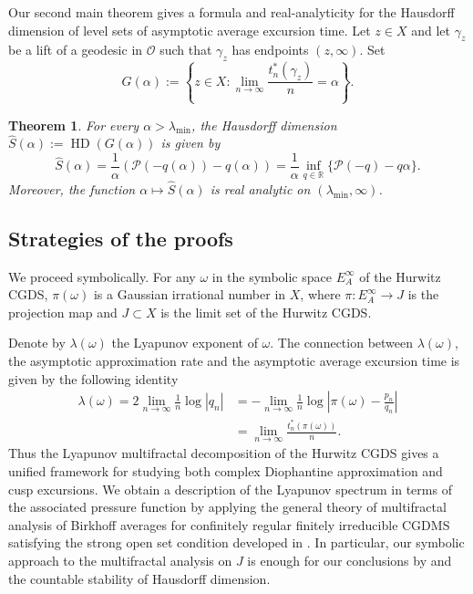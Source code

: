\documentclass[11pt]{amsart}
\theoremstyle{plain}
\newtheorem{theorem}{Theorem}[section]
\theoremstyle{definition}
\renewcommand\~{\tilde}%
\newcommand{\om}{\ensuremath{\omega}}
\numberwithin{equation}{section}
\begin{document}
Our second main theorem gives a formula and real-analyticity for the Hausdorff dimension of level sets of asymptotic average excursion time.
Let $z \in X$ and let $\gamma_z$ be a lift of a geodesic in $\mathcal{O}$ such that $\gamma_z$ has endpoints $(z,\infty)$.
Set 
$$G(\alpha)
    :=
    \left\{
    z \in X :
    \lim_{n\to\infty}
    \frac{t_n^*(\gamma_z)}{n}
    =
    \alpha
    \right\}.$$

\begin{theorem}\label{thm:main-2}
For every $\alpha>\lambda_{\min}$, the Hausdorff dimension $\hat S(\alpha):=\operatorname{HD}(G(\alpha))$
is given by
$$
    \hat S(\alpha)
    =
    \frac{1}{\alpha}
    \left(\mathcal P(-q(\alpha))-q(\alpha)\right)
    =
    \frac{1}{\alpha}
    \inf_{q\in\mathbb R}
    \{\mathcal P(-q)-q\alpha\}.
$$
Moreover, the function $\alpha \mapsto \hat S(\alpha)$ is real analytic on $(\lambda_{\min},\infty)$.
\end{theorem}


\subsection{Strategies of the proofs}
We proceed symbolically. For any $\om$ in the symbolic space $E_A^\infty$ of the Hurwitz CGDS, $\pi(\om)$ is a Gaussian irrational number in $X$, where $\pi : E_A^\infty \to J$ is the projection map and $J\subset X$ is the limit set of the Hurwitz CGDS.

Denote by $\lambda(\om)$ the Lyapunov exponent of $\om$. 
The connection between $\lambda(\om)$, the asymptotic approximation rate and the asymptotic average excursion time is given by the following identity
\begin{align*}
\lambda(\omega)= 2\lim_{n\to\infty}\frac{1}{n}\log |q_n|
&=-\lim_{n\to\infty} \frac{1}{n}
    \log
    \left|
    \pi(\omega)-\frac{p_n}{q_n}
    \right|\\
&=\lim_{n\to\infty}
    \frac{t_n^*(\pi(\omega))}{n}.
\end{align*}
Thus the Lyapunov multifractal decomposition of the Hurwitz CGDS gives a unified framework for studying both complex Diophantine approximation and cusp excursions. We obtain a description of the Lyapunov spectrum in terms of the associated pressure function by applying the general theory of multifractal analysis of Birkhoff averages for confinitely regular finitely irreducible CGDMS satisfying the strong open set condition developed in \cite{NDDis}. In particular, our symbolic approach to the multifractal analysis on $J$ is enough for our conclusions by \cite[Proposition 6.5]{NDDis} and the countable stability of Hausdorff dimension.
\end{document}
